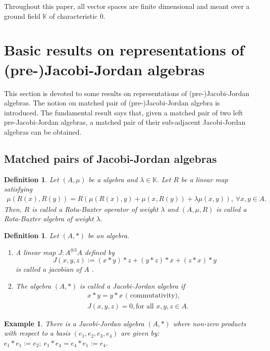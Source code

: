 \documentclass[12pt]{amsart}
\newtheorem{definition}[Theorem]{Definition}
\newtheorem{example}[Theorem]{Example}
\begin{document}
	Throughout this paper, all vector spaces  are finite dimensional and meant over a ground field $\mathbb{K}$ of characteristic 0.
	\section{Basic results on representations of (pre-)Jacobi-Jordan algebras}
	This section is devoted to some results on representations  of (pre-)Jacobi-Jordan algebras. The notion on matched pair of (pre-)Jacobi-Jordan algebra is introduced. The fundamental result says that, given  a matched pair of two left pre-Jacobi-Jordan algebras, a matched pair of their sub-adjacent Jacobi-Jordan algebras can be obtained.
	\subsection{Matched pairs of Jacobi-Jordan algebras}
	\begin{definition}
		Let $(A,\mu)$ be a algebra and 
		$\lambda\in\mathbb{K}.$  Let $R$ be a linear map satisfying 
		\begin{eqnarray}
			\mu(R(x),R(y))=R(\mu(R(x),y)+\mu(x,R(y))+\lambda\mu(x,y)),\ \forall x,y \in A. \label{Rota-Baxt}
		\end{eqnarray}
		Then, $R$ is called a Rota-Baxter operator of weight $\lambda$ and $(A,\mu, R)$ is called a Rota-Baxter algebra of weight 
		$\lambda.$
	\end{definition}
	\begin{definition}
		Let $(A,\ast)$ be an algebra.
		\begin{enumerate}
			\item 	A linear map $J: A^{\otimes 3} A$ defined by $$J(x,y,z):=(x\ast y)\ast z+(y\ast z)\ast x+(z\ast x)\ast y$$
			is called a jacobian of $A$ .
			\item The algebra $(A,\ast)$ is called a Jacobi-Jordan algebra if
			\begin{eqnarray}
				&& x\ast y=y\ast x \mbox{ ( commutativity)},\nonumber\\
				&& J(x,y,z)=0\label{JJi}, \mbox{for all $x,y,z\in A.$ }
			\end{eqnarray}
		\end{enumerate}
	\end{definition}
	\begin{example}
		There is a Jacobi-Jordan algebra $(A,\ast)$     
		\cite{dbaf} where non-zero products with respect to a basis $(e_1,e_2,e_3,e_4)$ are given by: $e_1\ast e_1:=e_2;\ e_1\ast e_4=e_4\ast e_1:=e_4.$
	\end{example}
\end{document}
